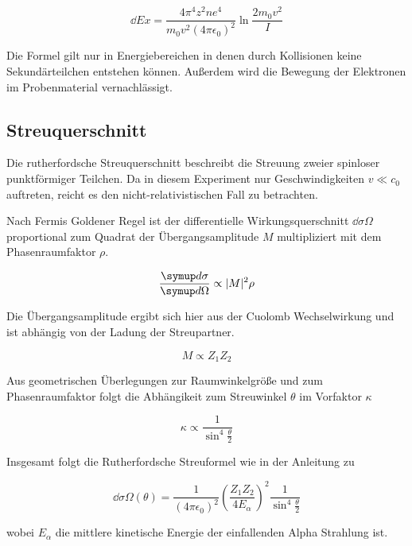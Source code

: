 \begin{equation}
  \label{eq:bethe}
  \dd{E}{x} = \frac{4 \pi^4 z^2 n e^4}{m_0 v^2 (4 \pi \epsilon_0)^2} \ln \frac{2 m_0 v^2}{I}
\end{equation}

Die Formel gilt nur in Energiebereichen in denen durch Kollisionen keine Sekundärteilchen entstehen können.
Außerdem wird die Bewegung der Elektronen im Probenmaterial vernachlässigt.


\subsection{Streuquerschnitt}
Die rutherfordsche Streuquerschnitt beschreibt die Streuung zweier spinloser punktförmiger Teilchen. Da in diesem Experiment nur Geschwindigkeiten
$v \ll c_0$ auftreten, reicht es den nicht-relativistischen Fall zu betrachten.

Nach Fermis Goldener Regel ist der differentielle Wirkungsquerschnitt $\dd{\sigma}{\Omega}$ proportional zum Quadrat der Übergangsamplitude $M$ multipliziert mit dem Phasenraumfaktor $\rho$.

\begin{equation}
  \dd{\sigma}{\Omega} \propto \abs{M}^2 \rho
\end{equation}

Die Übergangsamplitude ergibt sich hier aus der Cuolomb Wechselwirkung und ist abhängig von der Ladung der Streupartner.


\begin{equation}
  M \propto Z_1 Z_2
\end{equation}


Aus geometrischen Überlegungen zur Raumwinkelgröße und zum Phasenraumfaktor folgt die Abhängikeit zum Streuwinkel $\theta$ im Vorfaktor $\kappa$

\begin{equation}
  \kappa \propto \frac{1}{\sin^4{\frac{\theta}{2}}}
\end{equation}

Insgesamt folgt die Rutherfordsche Streuformel wie in der Anleitung zu

\begin{equation}
  \label{ruther}
  \dd{\sigma}{\Omega} (\theta) = \frac{1}{(4 \pi \epsilon_0)^2} \left( \frac{Z_1 Z_2}{4 E_{\alpha}} \right)^2 \frac{1}{\sin^4{\frac{\theta}{2}}}
\end{equation}

wobei $E_{\alpha}$ die mittlere kinetische Energie der einfallenden Alpha Strahlung ist.
